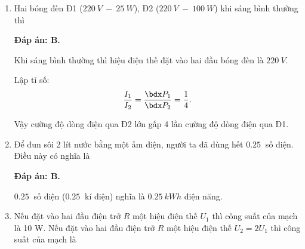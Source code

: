 \begin{enumerate}[label=\bfseries Câu \arabic*:]
{		Vì giá trị trên vượt mức dòng điện tối đa, do đó sẽ làm chảy cầu chì.
	}
	\item {}
	
	\cauhoi
	{Hai bóng đèn Đ1 ($\SI{220}{V}\ -\ \SI{25}{W}$), Đ2 ($\SI{220}{V}\ -\ \SI{100}{W}$) khi sáng bình thường thì
		
	}
	\loigiai
	{	\textbf{Đáp án: B.}
		
		Khi sáng bình thường thì hiệu điện thế đặt vào hai đầu bóng đèn là $\SI{220}{V}$.
		
		Lập tỉ số:
		$$\dfrac{I_1}{I_2} = \dfrac{\calP_1}{\calP_2} = \dfrac{1}{4}.$$
		
		Vậy cường độ dòng điện qua Đ2 lớn gấp 4 lần cường độ dòng điện qua Đ1.
	}
	\item {}
	
	\cauhoi
	{Để đun sôi 2 lít nước bằng một ấm điện, người ta đã dùng hết $\SI{0.25}{}$ số điện. Điều này có nghĩa là
		
	}
	\loigiai
	{	\textbf{Đáp án: B.}
		
		$\SI{0.25}{}$ số điện ($\SI{0.25}{}$ kí điện) nghĩa là $\SI{0.25}{kWh}$ điện năng.
	}
	\item {}
	
	\cauhoi
	{Nếu đặt vào hai đầu điện trở $R$ một hiệu điện thế $U_1$ thì công suất của mạch là 10 W. Nếu đặt vào hai đầu điện trở $R$ một hiệu điện thế $U_2=2U_1$ thì công suất của mạch là
		
}
\end{enumerate}
